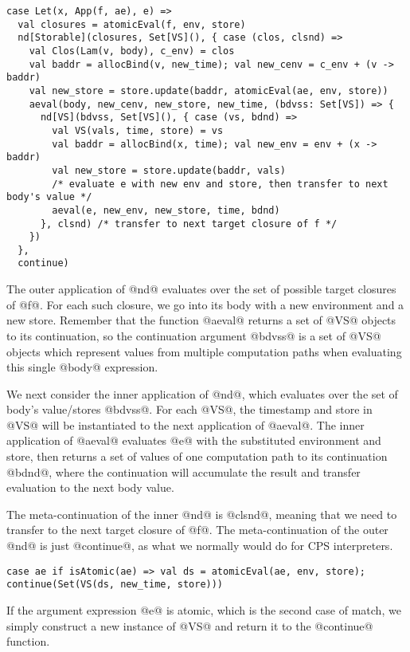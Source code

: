 \documentclass[acmsmall]{acmart}\settopmatter{}
\begin{document}
\begin{lstlisting}
case Let(x, App(f, ae), e) =>
  val closures = atomicEval(f, env, store)
  nd[Storable](closures, Set[VS](), { case (clos, clsnd) =>
    val Clos(Lam(v, body), c_env) = clos
    val baddr = allocBind(v, new_time); val new_cenv = c_env + (v -> baddr)
    val new_store = store.update(baddr, atomicEval(ae, env, store))
    aeval(body, new_cenv, new_store, new_time, (bdvss: Set[VS]) => {
      nd[VS](bdvss, Set[VS](), { case (vs, bdnd) =>
        val VS(vals, time, store) = vs
        val baddr = allocBind(x, time); val new_env = env + (x -> baddr)
        val new_store = store.update(baddr, vals)
        /* evaluate e with new env and store, then transfer to next body's value */
        aeval(e, new_env, new_store, time, bdnd)
      }, clsnd) /* transfer to next target closure of f */
    })
  },
  continue)
\end{lstlisting}

The outer application of @nd@ evaluates over the set of possible target closures of
@f@. For each such closure, we go into its body with a new environment and a new store.
Remember that the function @aeval@ returns a set of @VS@ objects to its continuation,
so the continuation argument @bdvss@ is a set of @VS@ objects which represent values
from multiple computation paths when evaluating this single @body@ expression.

We next consider the inner application of @nd@, which evaluates over the set of body's 
value/stores @bdvss@. For each @VS@, the timestamp and store in @VS@ will be instantiated to
the next application of @aeval@. The inner application of @aeval@ evaluates @e@ with the
substituted environment and store, then returns a set of values of one computation path 
to its continuation @bdnd@, where the continuation will accumulate the result and 
transfer evaluation to the next body value.

The meta-continuation of the inner @nd@ is @clsnd@, meaning that we need to transfer 
to the next target closure of @f@. The meta-continuation of the outer @nd@ is just 
@continue@, as what we normally would do for CPS interpreters.

\begin{lstlisting}
case ae if isAtomic(ae) => val ds = atomicEval(ae, env, store); continue(Set(VS(ds, new_time, store)))
\end{lstlisting}

If the argument expression @e@ is atomic, which is the second case of match, we simply 
construct a new instance of @VS@ and return it to the @continue@ function.
\end{document}

